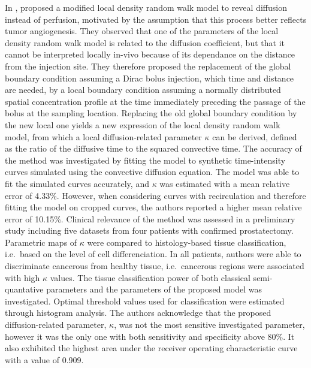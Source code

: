 In \citeyear{Kuenen:2011kr}, \citet{Kuenen:2011kr} proposed a modified local density random walk model to reveal diffusion instead of perfusion, motivated by the assumption that this process better reflects tumor angiogenesis. 
They observed that one of the parameters of the local density random walk model is related to the diffusion coefficient, but that it cannot be interpreted locally in-vivo because of its dependance on the distance from the injection site. 
They therefore proposed the replacement of the global boundary condition assuming a Dirac bolus injection, which time and distance are needed, by a local boundary condition assuming a normally distributed spatial concentration profile at the time immediately preceding the passage of the bolus at the sampling location.
Replacing the old global boundary condition by the new local one yields a new expression of the local density random walk model, from which a local diffusion-related parameter $\kappa$ can be derived, defined as the ratio of the diffusive time to the squared convective time.
The accuracy of the method was investigated by fitting the model to synthetic time-intensity curves simulated using the convective diffusion equation. 
The model was able to fit the simulated curves accurately, and $\kappa$ was estimated with a mean relative error of 4.33\%. 
However, when considering curves with recirculation and therefore fitting the model on cropped curves, the authors reported a higher mean relative error of 10.15\%. 
Clinical relevance of the method was assessed in a preliminary study including five datasets from four patients with confirmed prostatectomy. 
Parametric maps of $\kappa$ were compared to histology-based tissue classification, i.e.~based on the level of cell differenciation.
In all patients, authors were able to discriminate cancerous from healthy tissue, i.e.~cancerous regions were associated with high $\kappa$ values.
The tissue classification power of both classical semi-quantative parameters and the parameters of the proposed model was investigated. 
Optimal threshold values used for classification were estimated through histogram analysis.
The authors acknowledge that the proposed diffusion-related parameter, $\kappa$, was not the most sensitive investigated parameter, however it was the only one with both sensitivity and specificity above 80\%.
It also exhibited the highest area under the receiver operating characteristic curve with a value of 0.909. 


